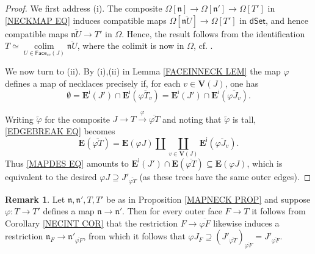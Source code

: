 \documentclass[a4paper,10pt
,draft
]{article}%
\numberwithin{equation}{section}
\numberwithin{figure}{section}
\theoremstyle{definition} %
\newtheorem{remark}[equation]{Remark}%
\DeclareMathOperator{\colim}{colim}%
\newcommand{\1}{\ensuremath{\mathbbm 1}}%
\begin{document}
\begin{proof}
	We first address (i).
	The composite
	$\Omega[\mathfrak{n}] \to 
	\Omega[\mathfrak{n}'] \to 
	\Omega[T']$
	in \eqref{NECKMAP EQ}
	induces compatible maps
	$\Omega[\overline{\mathfrak{n} U}] \to \Omega[T']$
	in $\mathsf{dSet}$,
	and hence 
	compatible maps
	$\overline{\mathfrak{n} U} \to T'$ 
	in $\Omega$.
	Hence, the result follows from the identification
	$T
	\simeq  
	\underset{U \in \mathsf{Face}_{sc}(J)}{\colim}
	\overline{\mathfrak{n} U}$, where the colimit is now in $\Omega$,
	cf. \cite[Cor. 3.70]{BP_geo}.
	
	We now turn to (ii).
	By (i),(ii) in Lemma \ref{FACEINNECK LEM}
	the map $\varphi$ defines a map of necklaces 
	precisely if, 
	for each $v \in \boldsymbol{V}(J)$, one has
	\begin{equation}\label{MAPDES EQ}
	\emptyset
	=
	\boldsymbol{E}^{\mathsf{i}}(J')
	\cap
	\boldsymbol{E}^{\mathsf{i}}(\overline{ \varphi T_v})
	=
	\boldsymbol{E}^{\mathsf{i}}(J')
	\cap
	\boldsymbol{E}^{\mathsf{i}}(\overline{ \varphi J_v}).
	\end{equation}
	
	Writing $\tilde{\varphi}$ for the composite
	$
	J \to T \xrightarrow{\varphi} \overline{\varphi T}
	$
	and noting that $\tilde{\varphi}$ is tall,
	\eqref{EDGEBREAK EQ} becomes 
	\begin{equation}\label{DECOMPPR EQ}
	\boldsymbol{E}(\overline{\varphi T})
	=
	\boldsymbol{E}(\varphi J)
	\amalg
	\coprod_{v \in \boldsymbol{V}(J)}
	\boldsymbol{E}^{\mathsf{i}}(\overline{\varphi J_v}).
	\end{equation}
	Thus \eqref{MAPDES EQ}
	amounts to
	$\boldsymbol{E}^{\mathsf{i}}(J') \cap 
	\boldsymbol{E}(\overline{\varphi T})
	\subseteq
	\boldsymbol{E}(\varphi J)$,
	which is equivalent to the desired
	$\varphi J \supseteq J'_{\overline{\varphi T}}$
	(as these trees have the same outer edges).
\end{proof}



\begin{remark}\label{NECKMAPCHAR REM}
	Let $\mathfrak{n},\mathfrak{n}',T,T'$ be as in
	Proposition \ref{MAPNECK PROP}
	and suppose 
	$\varphi \colon T \to T'$
	defines a map
	$\mathfrak{n} \to \mathfrak{n}'$.
	Then for every outer face $F \to T$
	it follows from 
	Corollary \ref{NECINT COR}
	that the restriction 
	$F \to \overline{\varphi F}$
	likewise induces a restriction
	$\mathfrak{n}_F \to \mathfrak{n}'_{\overline{\varphi F}}$,
	from which it follows that
	$\varphi J_F \supseteq 
	\left(J'_{\overline{\varphi T}}\right)_{\overline{\varphi F}}
	=
	J'_{\overline{\varphi F}}$.
\end{remark}
\end{document}
